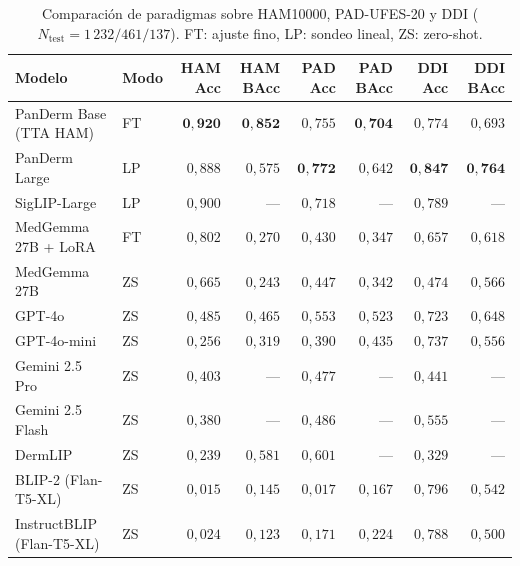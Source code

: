 \begin{table}[htbp]
\centering
\footnotesize
\setlength{\tabcolsep}{4pt}
\renewcommand{\arraystretch}{0.95}
\caption{Comparación de paradigmas sobre HAM10000, PAD-UFES-20 y DDI
($N_{\mathrm{test}} = 1\,232 / 461 / 137$). FT: ajuste fino, LP:
sondeo lineal, ZS: zero-shot.}
\label{tab:llm-comparativa}
\begin{tabular}{llrrrrrr}
\hline
Modelo                 & Modo  & HAM Acc       & HAM BAcc      & PAD Acc       & PAD BAcc      & DDI Acc       & DDI BAcc \\
\hline
PanDerm Base (TTA HAM) & FT    & $\mathbf{0{,}920}$ & $\mathbf{0{,}852}$ & $0{,}755$     & $\mathbf{0{,}704}$ & $0{,}774$     & $0{,}693$ \\
PanDerm Large          & LP    & $0{,}888$     & $0{,}575$     & $\mathbf{0{,}772}$ & $0{,}642$     & $\mathbf{0{,}847}$ & $\mathbf{0{,}764}$ \\
SigLIP-Large           & LP    & $0{,}900$     & ---           & $0{,}718$     & ---           & $0{,}789$     & --- \\
MedGemma 27B + LoRA    & FT    & $0{,}802$     & $0{,}270$     & $0{,}430$     & $0{,}347$     & $0{,}657$     & $0{,}618$ \\
MedGemma 27B           & ZS    & $0{,}665$     & $0{,}243$     & $0{,}447$     & $0{,}342$     & $0{,}474$     & $0{,}566$ \\
GPT-4o                 & ZS    & $0{,}485$     & $0{,}465$     & $0{,}553$     & $0{,}523$     & $0{,}723$     & $0{,}648$ \\
GPT-4o-mini            & ZS    & $0{,}256$     & $0{,}319$     & $0{,}390$     & $0{,}435$     & $0{,}737$     & $0{,}556$ \\
Gemini 2.5 Pro         & ZS    & $0{,}403$     & ---           & $0{,}477$     & ---           & $0{,}441$     & --- \\
Gemini 2.5 Flash       & ZS    & $0{,}380$     & ---           & $0{,}486$     & ---           & $0{,}555$     & --- \\
DermLIP                & ZS    & $0{,}239$     & $0{,}581$     & $0{,}601$     & ---           & $0{,}329$     & --- \\
BLIP-2 (Flan-T5-XL)    & ZS    & $0{,}015$     & $0{,}145$     & $0{,}017$     & $0{,}167$     & $0{,}796$     & $0{,}542$ \\
InstructBLIP (Flan-T5-XL)& ZS  & $0{,}024$     & $0{,}123$     & $0{,}171$     & $0{,}224$     & $0{,}788$     & $0{,}500$ \\
\hline
\end{tabular}
\end{table}


